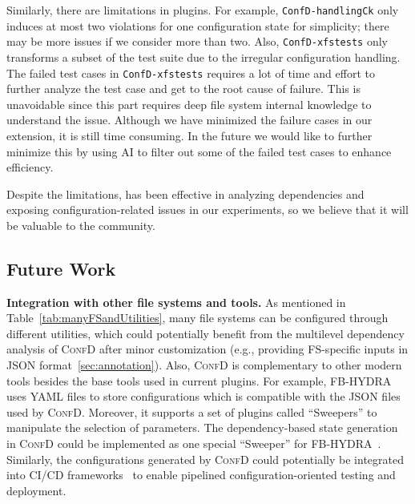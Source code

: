 Similarly, there are limitations in  plugins. For example, 
\texttt{ConfD-handlingCk} only induces at most two violations for one configuration state for simplicity; there may be more issues if we consider more than two.
Also,
\texttt{ConfD-xfstests}   only transforms  a subset of the test suite due to the irregular configuration handling. 
{The failed test cases in \texttt{ConfD-xfstests} requires a lot of time and effort to further analyze the test case and get to the root cause of failure. This is unavoidable since this part requires deep file system internal knowledge to understand the issue. Although we have minimized the failure cases in our extension, it is still time consuming. In the future we would like to further minimize this by using AI to filter out some of the failed test cases to enhance efficiency.}

Despite the limitations, \prj has been effective in analyzing dependencies and exposing configuration-related issues in our experiments, so we believe that it  
will be valuable to the community.


\subsection{Future Work}
\noindent
{\bf Integration with other file systems and tools.}
As mentioned in Table~\ref{tab:manyFSandUtilities}, many file systems 
can be configured through different utilities, which could potentially benefit from the multilevel dependency analysis of \textsc{ConfD} after minor customization (e.g., providing  FS-specific inputs in JSON format~\ref{sec:annotation}).
Also, \textsc{ConfD} is complementary to  other modern tools besides the base tools used in   current plugins. 
For example, FB-HYDRA ~\cite{Yadan2019Hydra}    uses YAML files to store configurations which is compatible with the JSON files used by \textsc{ConfD}. Moreover, it supports a set of plugins called ``Sweepers'' to manipulate the selection of parameters. The dependency-based  state generation in \textsc{ConfD} could be implemented as one special ``Sweeper'' for FB-HYDRA~\cite{Yadan2019Hydra}. 
Similarly, the configurations generated by \textsc{ConfD} could potentially be integrated into CI/CD frameworks~\cite{Jenkins} to enable pipelined configuration-oriented testing and deployment. 

